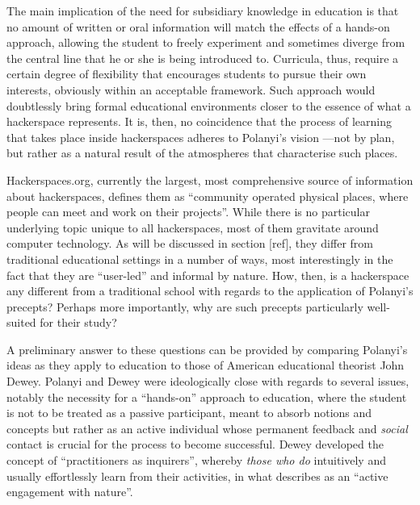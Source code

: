 The main implication of the need for subsidiary knowledge in education is that no amount of written or oral information will match the effects of a hands-on approach, allowing the student to freely experiment and sometimes diverge from the central line that he or she is being introduced to. Curricula, thus, require a certain degree of flexibility that encourages students to pursue their own interests, obviously within an acceptable framework. Such approach would doubtlessly bring formal educational environments closer to the essence of what a hackerspace represents. It is, then, no coincidence that the process of learning that takes place inside hackerspaces adheres to Polanyi's vision ---not by plan, but rather as a natural result of the atmospheres that characterise such places.

Hackerspaces.org, currently the largest, most comprehensive source of information about hackerspaces, defines them as ``community operated physical places, where people can meet and work on their projects''. While there is no particular underlying topic unique to all hackerspaces, most of them gravitate around computer technology. As will be discussed in section [ref], they differ from traditional educational settings in a number of ways, most interestingly in the fact that they are ``user-led'' and informal by nature. How, then, is a hackerspace any different from a traditional school with regards to the application of Polanyi's precepts? Perhaps more importantly, why are such precepts particularly well-suited for their study?

A preliminary answer to these questions can be provided by comparing Polanyi's ideas as they apply to education to those of American educational theorist John Dewey. Polanyi and Dewey were ideologically close with regards to several issues, notably the necessity for a ``hands-on'' approach to education, where the student is not to be treated as a passive participant, meant to absorb notions and concepts but rather as an active individual whose permanent feedback and \emph{social} contact is crucial for the process to become successful. Dewey developed the concept of ``practitioners as inquirers'', whereby \textit{those who do} intuitively and usually effortlessly learn from their activities, in what \citet{evans00} describes as an ``active engagement with nature''.

